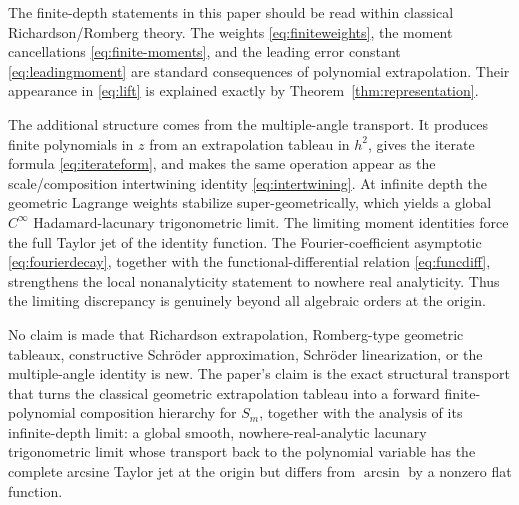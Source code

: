 \documentclass[11pt]{article}
\theoremstyle{remark}
\begin{document}
The finite-depth statements in this paper should be read within classical
Richardson/Romberg theory.  The weights \eqref{eq:finiteweights}, the moment
cancellations \eqref{eq:finite-moments}, and the leading error constant
\eqref{eq:leadingmoment} are standard consequences of polynomial
extrapolation.  Their appearance in \eqref{eq:lift} is explained exactly by
Theorem~\ref{thm:representation}.

The additional structure comes from the multiple-angle transport.  It produces
finite polynomials in $z$ from an extrapolation tableau in $h^2$, gives the
iterate formula \eqref{eq:iterateform}, and makes the same operation appear as
the scale/composition intertwining identity \eqref{eq:intertwining}.  At
infinite depth the geometric Lagrange weights stabilize super-geometrically,
which yields a global $C^\infty$ Hadamard-lacunary trigonometric limit.  The
limiting moment identities force the full Taylor jet of the identity function.
The Fourier-coefficient asymptotic \eqref{eq:fourierdecay}, together with the
functional-differential relation \eqref{eq:funcdiff}, strengthens the local
nonanalyticity statement to nowhere real analyticity.  Thus the limiting
discrepancy is genuinely beyond all algebraic orders at the origin.

No claim is made that Richardson extrapolation, Romberg-type geometric
tableaux, constructive Schr\"oder approximation, Schr\"oder linearization, or
the multiple-angle identity is new.  The paper's claim is the exact structural
transport that turns the classical geometric extrapolation tableau into a
forward finite-polynomial composition hierarchy for $S_m$, together with the
analysis of its infinite-depth limit: a global smooth, nowhere-real-analytic
lacunary trigonometric limit whose transport back to the polynomial variable
has the complete arcsine Taylor jet at the origin but differs from $\arcsin$
by a nonzero flat function.
\end{document}
